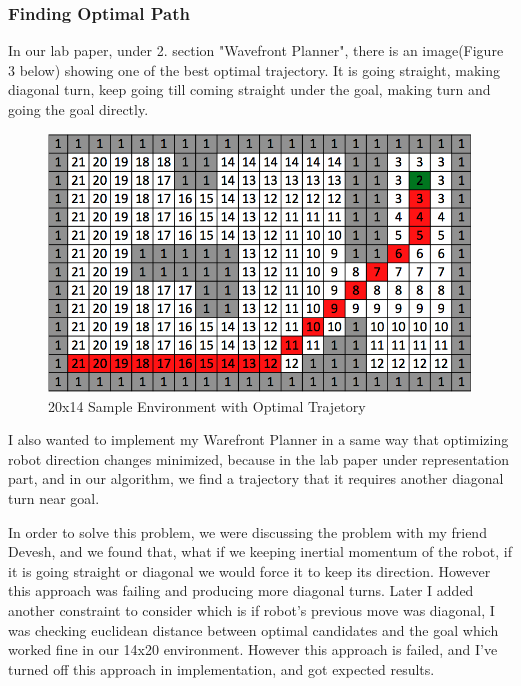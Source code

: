 \documentclass{article}
\begin{document}
		\subsubsection{Finding Optimal Path}	
		
		In our lab paper, under 2. section "Wavefront Planner", there is an image(Figure 3 below) showing one of the best optimal trajectory. It is going straight, making diagonal turn, keep going till coming straight under the goal, making turn and going the goal directly.
		
\begin{figure}[ht!]
\begin{center}
\includegraphics[scale=0.1]{optimalTrajectory1.png}
\caption{20x14 Sample Environment with Optimal Trajetory}
\end{center}
\end{figure}

	I also wanted to implement my Warefront Planner in a same way that optimizing robot direction changes minimized, because in the lab paper under representation part, and in our algorithm, we find a trajectory that it requires another diagonal turn near goal.
	
	In order to solve this problem, we were discussing the problem with my friend Devesh, and we found that, what if we keeping inertial momentum of the robot, if it is going straight or diagonal we would force it to keep its direction. However this approach was failing and producing more diagonal turns. Later I added another constraint to consider which is if robot's previous move was diagonal, I was checking euclidean distance between optimal candidates and the goal which worked fine in our 14x20 environment. However this approach is failed, and I've turned off this approach in implementation, and got expected results.
	
\end{document}
